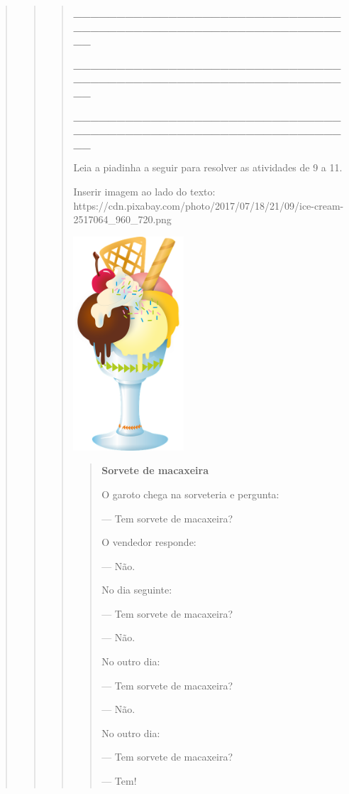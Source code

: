 \begin{quote}
\begin{quote}
\begin{quote}
\textbf{\_\_\_\_\_\_\_\_\_\_\_\_\_\_\_\_\_\_\_\_\_\_\_\_\_\_\_\_\_\_\_\_\_\_\_\_\_\_\_\_\_\_\_\_\_\_\_\_\_\_\_\_\_\_\_\_\_\_\_\_\_\_\_\_}

\protect\hypertarget{_Hlk127808036}{}{}\textbf{\_\_\_\_\_\_\_\_\_\_\_\_\_\_\_\_\_\_\_\_\_\_\_\_\_\_\_\_\_\_\_\_\_\_\_\_\_\_\_\_\_\_\_\_\_\_\_\_\_\_\_\_\_\_\_\_\_\_\_\_\_\_\_\_}

\textbf{\_\_\_\_\_\_\_\_\_\_\_\_\_\_\_\_\_\_\_\_\_\_\_\_\_\_\_\_\_\_\_\_\_\_\_\_\_\_\_\_\_\_\_\_\_\_\_\_\_\_\_\_\_\_\_\_\_\_\_\_\_\_\_\_}

Leia a piadinha a seguir para resolver as atividades de 9 a 11.

Inserir imagem ao lado do texto:
https://cdn.pixabay.com/photo/2017/07/18/21/09/ice-cream-2517064\_960\_720.png

\includegraphics[width=1.61997in,height=3.13542in]{media/image20.png}

\begin{quote}
\textbf{Sorvete de macaxeira}

O garoto chega na sorveteria e pergunta:

--- Tem sorvete de macaxeira?

O vendedor responde:

--- Não.

No dia seguinte:

--- Tem sorvete de macaxeira?

--- Não.

No outro dia:

--- Tem sorvete de macaxeira?

--- Não.

No outro dia:

--- Tem sorvete de macaxeira?

--- Tem!


\end{quote}
\end{quote}
\end{quote}
\end{quote}
